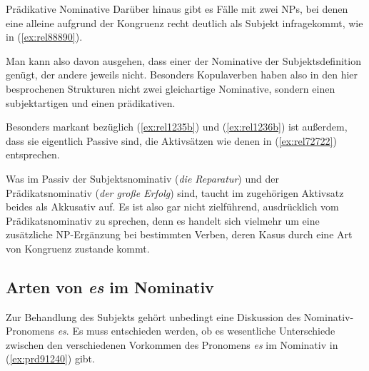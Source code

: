 \begin{Vertiefung}{Prädikative Nominative}
Darüber hinaus gibt es Fälle mit zwei NPs, bei denen eine alleine aufgrund der Kongruenz recht deutlich als Subjekt infragekommt, wie in (\ref{ex:rel88890}).

\begin{exe}
\end{exe}

Man kann also davon ausgehen, dass einer der Nominative der Subjektsdefinition genügt, der andere jeweils nicht.
Besonders Kopulaverben haben also in den hier besprochenen Strukturen nicht zwei gleichartige Nominative, sondern einen subjektartigen und einen prädikativen.

Besonders markant bezüglich (\ref{ex:rel1235b}) und (\ref{ex:rel1236b}) ist außerdem, dass sie eigentlich Passive sind, die Aktivsätzen wie denen in (\ref{ex:rel72722}) entsprechen.

\begin{exe}
  \ex\label{ex:rel72722}
  \begin{xlist}
  \end{xlist}
\end{exe}

Was im Passiv der Subjektsnominativ (\textit{die Reparatur}) und der Prädikatsnominativ (\textit{der große Erfolg}) sind, taucht im zugehörigen Aktivsatz beides als Akkusativ auf.
Es ist also gar nicht zielführend, ausdrücklich vom Prädikatsnominativ zu sprechen, denn es handelt sich vielmehr um eine zusätzliche NP-Ergänzung bei bestimmten Verben, deren Kasus durch eine Art von Kongruenz zustande kommt.

\end{Vertiefung}

\subsection{Arten von \textit{es} im Nominativ}

\label{sec:expletiva}

Zur Behandlung des Subjekts gehört unbedingt eine Diskussion des Nominativ-Pronomens \textit{es}.
Es muss entschieden werden, ob es wesentliche Unterschiede zwischen den verschiedenen Vorkommen des Pronomens \textit{es} im Nominativ in (\ref{ex:prd91240}) gibt.

\begin{exe}
  \ex\label{ex:prd91240}
  \begin{xlist}
  \end{xlist}
\end{exe}

